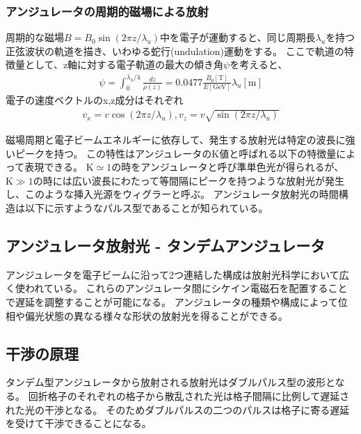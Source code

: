 \documentclass[a4paper,11pt,uplatex]{jsbook}
\begin{document}
\subsubsection{アンジュレータの周期的磁場による放射}
周期的な磁場$B = B_0 \sin(2\pi z/\lambda_u)$中を電子が運動すると、同じ周期長$\lambda_u$を持つ正弦波状の軌道を描き、いわゆる蛇行(undulation)運動をする。
ここで軌道の特徴量として、z軸に対する電子軌道の最大の傾き角$\psi$を考えると、
\begin{eqnarray}
  \psi = \int_0^{\lambda_u/4} \frac{dz}{\rho(z)} = 0.0477\frac{B_0[\text{T}]}{E[\text{GeV}]} \lambda_u[\text{m}]
\end{eqnarray}
電子の速度ベクトルのx,z成分はそれぞれ
\begin{eqnarray}
  v_x = v \cos(2\pi z/\lambda_u),
  v_z = v \sqrt{ \sin(2\pi z/\lambda_u)}
\end{eqnarray}

磁場周期と電子ビームエネルギーに依存して、発生する放射光は特定の波長に強いピークを持つ。
この特性はアンジュレータのK値と呼ばれる以下の特徴量によって表現できる。
$\text{K} \simeq 1$の時をアンジュレータと呼び準単色光が得られるが、$\text{K} \gg 1$の時には広い波長にわたって等間隔にピークを持つような放射光が発生し、このような挿入光源をウィグラーと呼ぶ。
アンジュレータ放射光の時間構造は以下に示すようなパルス型であることが知られている。
\subsection{アンジュレータ放射光 - タンデムアンジュレータ}
アンジュレータを電子ビームに沿って2つ連結した構成は放射光科学において広く使われている。
これらのアンジュレータ間にシケイン電磁石を配置することで遅延を調整することが可能になる。
アンジュレータの種類や構成によって位相や偏光状態の異なる様々な形状の放射光を得ることができる。
\subsection{干渉の原理}\label{sec:interference}
タンデム型アンジュレータから放射される放射光はダブルパルス型の波形となる。
回折格子のそれぞれの格子から散乱された光は格子間隔に比例して遅延された光の干渉となる。
そのためダブルパルスの二つのパルスは格子に寄る遅延を受けて干渉できることになる。
\end{document}
